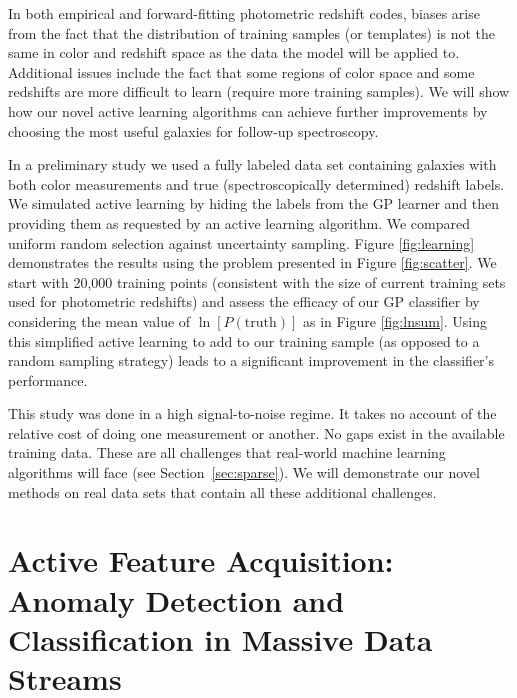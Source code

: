 \documentclass[prd,nofootbib,floatfix,11pt,tightenlines]{revtex4}
\begin{document}
In both empirical and forward-fitting photometric redshift codes, biases
arise from the fact that the distribution of training samples (or templates)
is not the same in color and redshift space as the data the model will be
applied to.  Additional issues include the fact that some regions of color
space and some redshifts are more difficult to learn (require more training
samples).  We will show how our novel active learning algorithms can
achieve further improvements by choosing the most useful galaxies for
follow-up spectroscopy.

In a preliminary study we used a fully labeled data set containing galaxies
with both color measurements and true (spectroscopically determined)
redshift labels.  We simulated active learning by hiding the labels from
the GP learner and then providing them as requested by an active learning
algorithm.  We compared uniform random selection against uncertainty
sampling.  Figure \ref{fig:learning} demonstrates the results using the
problem presented in Figure \ref{fig:scatter}. %
We start with 20,000 training points (consistent with the size of
current training sets used for photometric redshifts) and assess the efficacy of our
GP classifier by considering the mean value of $\ln[P(\text{truth})]$ as in
Figure \ref{fig:lnsum}.  Using this simplified active learning to add
to our training sample (as opposed to a random sampling strategy) 
leads to a significant improvement in the classifier's performance.

This study was done in a high signal-to-noise regime.  It takes no account
of the relative cost of doing one measurement or another.  No gaps exist in
the available training data.  These are all challenges that real-world
machine learning algorithms will face (see Section~\ref{sec:sparse}). 
We will demonstrate our novel
methods on real data sets that contain all these additional challenges.


\section{Active Feature Acquisition:
Anomaly Detection and Classification in Massive Data
 Streams}
\label{sec:anoms}
\end{document}
